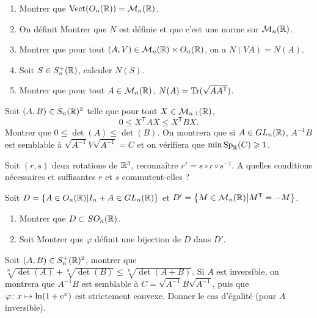 \documentclass[12pt]{article}
\begin{document}
\begin{exercise}
	\phantom{}
	\begin{enumerate}
		\item Montrer que $\operatorname{Vect}(O_n(\mathbb{R}))=\mathcal{M}_{n}(\mathbb{R})$.
		\item On définit 
		Montrer que $N$ est définie et que c'est une norme sur $\mathcal{M}_{n}(\mathbb{R})$.
		\item Montrer que pour tout $(A,V)\in\mathcal{M}_{n}(\mathbb{R})\times O_n(\mathbb{R})$, on a $N(VA)=N(A)$.
		\item Soit $S\in S_n^{+}(\mathbb{R})$, calculer $N(S)$.
		\item Montrer que pour tout $A\in\mathcal{M}_{n}(\mathbb{R})$, $N(A)=\operatorname{Tr}(\sqrt{AA^{\mathsf{T}}})$.
	\end{enumerate}
\end{exercise}

\begin{exercise}
	Soit $(A,B)\in S_n(\mathbb{R})^{2}$ telle que pour tout $X\in\mathcal{M}_{n,1}(\mathbb{R})$,
	\begin{equation}
		0\leqslant X^{\mathsf{T}}AX\leqslant X^{\mathsf{T}}BX.
	\end{equation}
	Montrer que $0\leqslant \det(A)\leqslant \det(B)$. On montrera que si $A\in GL_{n}(\mathbb{R})$, $A^{-1}B$ est semblable à $\sqrt{A^{-1}}V\sqrt{A^{-1}}=C$ et on vérifiera que $\min\operatorname{Sp}_{\mathbb{R}}(C)\geqslant1$.
\end{exercise}

\begin{exercise}
	Soit $(r,s)$ deux rotations de $\mathbb{R}^{3}$, reconnaître $r'=s\circ r\circ s^{-1}$. A quelles conditions nécessaires et suffisantes $r$ et $s$ commutent-elles ?
\end{exercise}

\begin{exercise}
	Soit $D=\left\lbrace A\in O_n(\mathbb{R})\middle| I_n+A\in GL_n(\mathbb{R})\right\rbrace$ et $D'=\left\lbrace M\in \mathcal{M}_n(\mathbb{R})\middle| M^{\mathsf{T}}=-M\right\rbrace$.
	\begin{enumerate}
		\item Montrer que $D\subset SO_n(\mathbb{R})$.
		\item Soit 
		Montrer que $\varphi$ définit une bijection de $D$ dans $D'$.
	\end{enumerate}
\end{exercise}

\begin{exercise}
	Soit $(A,B)\in S_n^{+}(\mathbb{R})^{2}$, montrer que $\sqrt[n]{\det(A)}+\sqrt[n]{\det(B)}\leqslant\sqrt[n]{\det(A+B)}$. Si $A$ est inversible, on montrera que $A^{-1}B$ est semblable à $C=\sqrt{A^{-1}}B\sqrt{A^{-1}}$, puis que $\varphi\colon x\mapsto\ln(1+\mathrm{e}^{x})$ est strictement convexe. Donner le cas d'égalité (pour $A$ inversible).
\end{exercise}
\end{document}
